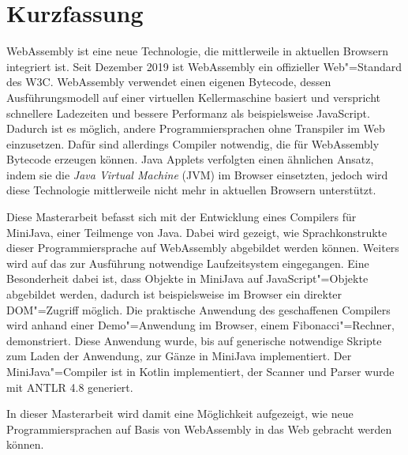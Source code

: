 \chapter{Kurzfassung}

WebAssembly ist eine neue Technologie, die mittlerweile in aktuellen Browsern integriert ist. Seit Dezember 2019 ist WebAssembly ein offizieller Web"=Standard des W3C. WebAssembly verwendet einen eigenen Bytecode, dessen Ausführungsmodell auf einer virtuellen Kellermaschine basiert und verspricht schnellere Ladezeiten und bessere Performanz als beispielsweise JavaScript. Dadurch ist es möglich, andere Programmiersprachen ohne Transpiler im Web einzusetzen. Dafür sind allerdings Compiler notwendig, die für WebAssembly Bytecode erzeugen können. Java Applets verfolgten einen ähnlichen Ansatz, indem sie die \emph{Java Virtual Machine} (JVM) im Browser einsetzten, jedoch wird diese Technologie mittlerweile nicht mehr in aktuellen Browsern unterstützt.

Diese Masterarbeit befasst sich mit der Entwicklung eines Compilers für MiniJava, einer Teilmenge von Java. Dabei wird gezeigt, wie Sprachkonstrukte dieser Programmiersprache auf WebAssembly abgebildet werden können. Weiters wird auf das zur Ausführung notwendige Laufzeitsystem eingegangen. Eine Besonderheit dabei ist, dass Objekte in MiniJava auf JavaScript"=Objekte abgebildet werden, dadurch ist beispielsweise im Browser ein direkter DOM"=Zugriff möglich. Die praktische Anwendung des geschaffenen Compilers wird anhand einer Demo"=Anwendung im Browser, einem Fibonacci"=Rechner, demonstriert. Diese Anwendung wurde, bis auf generische notwendige Skripte zum Laden der Anwendung, zur Gänze in MiniJava implementiert. Der MiniJava"=Compiler ist in Kotlin implementiert, der Scanner und Parser wurde mit ANTLR 4.8 generiert.

In dieser Masterarbeit wird damit eine Möglichkeit aufgezeigt, wie neue Programmiersprachen auf Basis von WebAssembly in das Web gebracht werden können.
